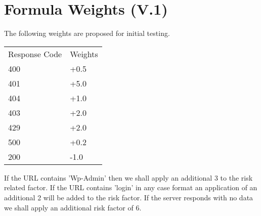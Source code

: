 \section{Formula Weights (V.1)} \label{Weights}


The following weights are proposed for initial testing.

\begin{table}[H]
\begin{tabular}{ll}
Response Code & Weights \\
400           & +0.5    \\
401           & +5.0    \\
404           & +1.0 \\
403           & +2.0    \\
429           & +2.0    \\
500           & +0.2    \\
200           & -1.0   
\end{tabular}
\end{table}

If the URL contains 'Wp-Admin' then we shall apply an additional 3 to the risk related factor. If the URL contains 'login' in any case format an application of an additional 2 will be added to the risk factor. If the server responds with no data we shall apply an additional risk factor of 6.